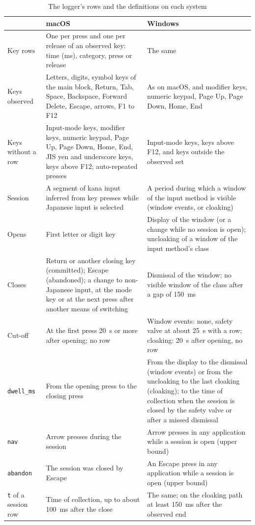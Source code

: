 \begin{table}[t]
\caption{The logger's rows and the definitions on each system}
\label{tab:rows}
\begin{tabular}{L{0.18}L{0.41}L{0.41}}
\toprule
& macOS & Windows \\
\midrule
Key rows & One per press and one per release of an observed key: time (ms), category, press or release & The same \\
Keys observed & Letters, digits, symbol keys of the main block, Return, Tab, Space, Backspace, Forward Delete, Escape, arrows, F1 to F12 & As on macOS, and modifier keys, numeric keypad, Page Up, Page Down, Home, End \\
Keys without a row & Input-mode keys, modifier keys, numeric keypad, Page Up, Page Down, Home, End, JIS yen and underscore keys, keys above F12; auto-repeated presses & Input-mode keys, keys above F12, and keys outside the observed set \\
Session & A segment of kana input inferred from key presses while Japanese input is selected & A period during which a window of the input method is visible (window events, or cloaking) \\
Opens & First letter or digit key & Display of the window (or a change while no session is open); uncloaking of a window of the input method's class \\
Closes & Return or another closing key (committed); Escape (abandoned); a change to non-Japanese input, at the mode key or at the next press after another means of switching & Dismissal of the window; no visible window of the class after a gap of 150~ms \\
Cut-off & At the first press 20~s or more after opening; no row & Window events: none, safety valve at about 25~s with a row; cloaking: 20~s after opening, no row \\
\texttt{dwell\_ms} & From the opening press to the closing press & From the display to the dismissal (window events) or from the uncloaking to the last cloaking (cloaking); to the time of collection when the session is closed by the safety valve or after a missed dismissal \\
\texttt{nav} & Arrow presses during the session & Arrow presses in any application while a session is open (upper bound) \\
\texttt{abandon} & The session was closed by Escape & An Escape press in any application while a session is open (upper bound) \\
\texttt{t} of a session row & Time of collection, up to about 100~ms after the close & The same; on the cloaking path at least 150~ms after the observed end \\
\bottomrule
\end{tabular}
\end{table}

